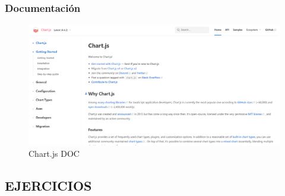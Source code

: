 \documentclass{article}
\begin{document}
	\subsubsection{Documentación}
	\begin{figure}[H]
		\centering
		\includegraphics[width=1\textwidth,keepaspectratio]{img/Chart.png}
		\caption{Chart.js DOC}
	\end{figure}
	\subsection{EJERCICIOS}
\end{document}
